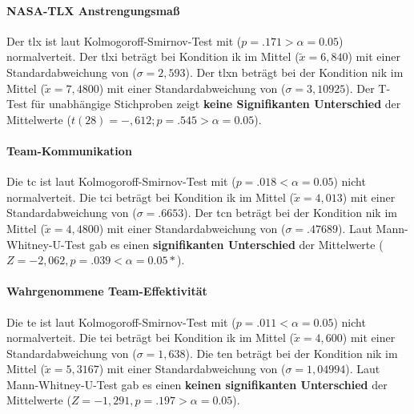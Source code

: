 \documentclass[a4paper,11pt]{article}%
\renewcommand{\\}{\vspace*{0.5\baselineskip} \newline}
\begin{document}
\paragraph{NASA-TLX \dq{}Anstrengungsmaß\dq{}} 
Der \acf{tlx} ist laut Kolmogoroff-Smirnov-Test mit ($p = .171 > \alpha = 0.05$) normalverteit. 
Der \ac{tlxi} beträgt bei Kondition \ac{ik} im Mittel ($\tilde x = 6,840$) mit einer Standardabweichung von ($\sigma = 2,593$).
Der \ac{tlxn} beträgt bei der Kondition \ac{nik} im Mittel ($\tilde x = 7,4800$) mit einer Standardabweichung von ($\sigma = 3,10925$). Der T-Test für unabhängige Stichproben zeigt \textbf{keine Signifikanten Unterschied} der Mittelwerte ($t(28) = -,612; p = .545 > \alpha = 0.05$).

\paragraph{Team-Kommunikation} 
Die \acf{tc} ist laut Kolmogoroff-Smirnov-Test mit ($p = .018 < \alpha = 0.05$) nicht normalverteit. 
Die \ac{tci} beträgt bei Kondition \ac{ik} im Mittel ($\tilde x = 4,013$) mit einer Standardabweichung von ($\sigma = .6653$).
Der \ac{tcn} beträgt bei der Kondition \ac{nik} im Mittel ($\tilde x = 4,4800$) mit einer Standardabweichung von ($\sigma = .47689$). Laut Mann-Whitney-U-Test gab es einen \textbf{signifikanten Unterschied} der Mittelwerte ($ Z = -2,062 , p = .039 < \alpha = 0.05*$).

\paragraph{Wahrgenommene Team-Effektivität}
Die \acf{te} ist laut Kolmogoroff-Smirnov-Test mit ($p = .011 < \alpha = 0.05$) nicht normalverteit. 
Die \ac{tei} beträgt bei Kondition \ac{ik} im Mittel ($\tilde x = 4,600$) mit einer Standardabweichung von ($\sigma = 1,638$).
Die \ac{ten} beträgt bei der Kondition \ac{nik} im Mittel ($\tilde x = 5,3167$) mit einer Standardabweichung von ($\sigma = 1,04994$). Laut Mann-Whitney-U-Test gab es einen \textbf{keinen signifikanten Unterschied} der Mittelwerte ($ Z = -1,291 , p = .197 > \alpha = 0.05$).

\end{document}
